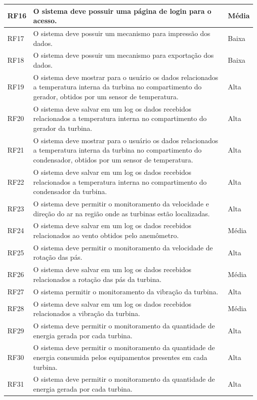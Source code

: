\begin{longtable}{|p{4cm}|p{9cm}|p{2cm}|}
RF16& 	O sistema deve possuir uma página de login para o acesso.		& Média	\\ \hline
RF17& 	O sistema deve possuir um mecanismo para impressão dos dados.	& Baixa\\ \hline
RF18& 	O sistema deve possuir um mecanismo para exportação dos dados.& 	Baixa		\\ \hline	
RF19& 	O sistema deve mostrar para o usuário os dados relacionados a temperatura interna da turbina no compartimento do gerador, obtidos por um sensor de temperatura.& 	Alta\\ \hline
RF20& 	O sistema deve salvar em um log os dados recebidos relacionados a temperatura interna no compartimento do gerador da turbina.	& Alta\\ \hline
RF21& 	O sistema deve mostrar para o usuário os dados relacionados a temperatura interna da turbina no compartimento do condensador, obtidos por um sensor de temperatura.	& Alta\\ \hline
RF22& 	O sistema deve salvar em um log os dados recebidos relacionados a temperatura interna no compartimento do condensador da turbina.	& Alta\\ \hline
RF23& 	O sistema deve permitir o monitoramento da velocidade e direção do ar na região onde as turbinas estão localizadas.& 	Alta\\ \hline
RF24& 	O sistema deve salvar em um log os dados recebidos relacionados ao vento obtidos pelo anemômetro.	& Média\\ \hline
RF25& 	O sistema deve permitir o monitoramento da velocidade de rotação das pás.& 	Alta\\ \hline
RF26& 	O sistema deve salvar em um log os dados recebidos relacionados a rotação das pás da turbina.	& Média\\ \hline
RF27& 	O sistema permitir o monitoramento da vibração da turbina.	& Alta\\ \hline
RF28& 	O sistema deve salvar em um log os dados recebidos relacionados a vibração da turbina.& 	Média\\ \hline
RF29& 	O sistema deve permitir o monitoramento da quantidade de energia gerada por cada turbina.	& Alta\\ \hline
RF30& 	O sistema deve permitir o monitoramento da quantidade de energia consumida pelos equipamentos presentes em cada turbina.	& Alta\\ \hline
RF31& 	O sistema deve permitir o monitoramento da quantidade de energia gerada por cada turbina.	& Alta\\ \hline

\end{longtable}
